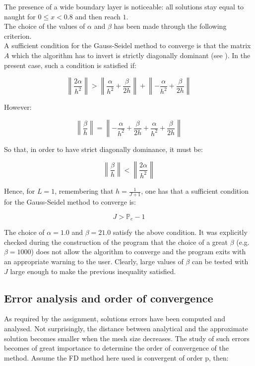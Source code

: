 \documentclass[11pt]{article}
\theoremstyle{theorem}
\theoremstyle{definition}
\begin{document}
The presence of a wide boundary layer is noticeable: all solutions stay equal to naught for $0\le x < 0.8$ and then reach $1$.\\

The choice of the values of $\alpha$ and $\beta$ has been made through the following criterion.\\
A sufficient condition for the Gauss-Seidel method to converge is that the matrix $A$ which the algorithm has to invert is strictly diagonally dominant (see \cite{numerical-math}). In the present case, such a condition is satisfied if:

$$\left\|\frac{2\alpha}{h^2}\right\|> \left\|\frac{\alpha}{h^2}+\frac{\beta}{2h}\right\| + \left\|-\frac{\alpha}{h^2}+\frac{\beta}{2h}\right\|$$

However:

$$\left\|\frac{\beta}{h}\right\|= \left\|-\frac{\alpha}{h^2}+\frac{\beta}{2h}+\frac{\alpha}{h^2}+\frac{\beta}{2h}\right\|$$

So that, in order to have strict diagonally dominance, it must be:

$$\left\|\frac{\beta}{h}\right\|<\left\|\frac{2\alpha}{h^2}\right\|$$

Hence, for $L=1$, remembering that $h=\frac{1}{J+1}$, one has that a sufficient condition for the Gauss-Seidel method to converge is:

$$J>\mathbb{P}_e-1$$

The choice of $\alpha=1.0$ and $\beta=21.0$ satisfy the above condition. It was explicitly checked during the construction of the program that the choice of a great $\beta$ (e.g. $\beta=1000$) does not allow the algorithm to converge and the program exits with an appropriate warning to the user. Clearly, large values of $\beta$ can be tested with $J$ large enough to make the previous inequality satisfied.\\

\subsection{Error analysis and order of convergence}
\label{subsec:Error}
As required by the assignment, solutions errors have been computed and analysed. Not surprisingly, the distance between analytical and the approximate solution becomes smaller when the mesh size decreases. The study of such errors becomes of great importance to determine the order of convergence of the method. Assume the FD method here used is convergent of order p, then:
\end{document}
